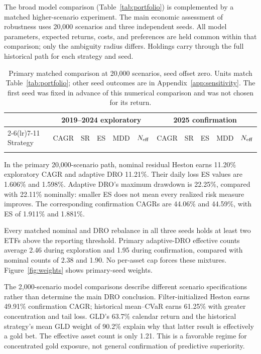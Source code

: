 The broad model comparison (Table~\ref{tab:portfolio}) is complemented by a matched higher-scenario experiment. The main economic assessment of robustness uses 20,000 scenarios and three independent seeds. All model parameters, expected returns, costs, and preferences are held common within that comparison; only the ambiguity radius differs. Holdings carry through the full historical path for each strategy and seed.

\begin{table}[t]
\centering\small\setlength{\tabcolsep}{4pt}
\caption{Primary matched comparison at 20,000 scenarios, seed offset zero. Units match Table~\ref{tab:portfolio}; other seed outcomes are in Appendix~\ref{app:sensitivity}. The first seed was fixed in advance of this numerical comparison and was not chosen for its return.}
\label{tab:paired}
\begin{tabular}{lrrrrrrrrrr}\toprule
&\multicolumn{5}{c}{2019--2024 exploratory}&\multicolumn{5}{c}{2025 confirmation}\\
\cmidrule(lr){2-6}\cmidrule(lr){7-11}
Strategy&CAGR&SR&ES&MDD&$N_{\rm eff}$&CAGR&SR&ES&MDD&$N_{\rm eff}$\\\midrule
\\\bottomrule
\end{tabular}
\end{table}

In the primary 20,000-scenario path, nominal residual Heston earns 11.20\% exploratory CAGR and adaptive DRO 11.21\%. Their daily loss ES values are 1.606\% and 1.598\%. Adaptive DRO's maximum drawdown is 22.25\%, compared with 22.11\% nominally: smaller ES does not mean every realized risk measure improves. The corresponding confirmation CAGRs are 44.06\% and 44.59\%, with ES of 1.911\% and 1.881\%.

Every matched nominal and DRO rebalance in all three seeds holds at least two ETFs above the reporting threshold. Primary adaptive-DRO effective counts average 2.46 during exploration and 1.95 during confirmation, compared with nominal counts of 2.38 and 1.90. No per-asset cap forces these mixtures. Figure~\ref{fig:weights} shows primary-seed weights.

The 2,000-scenario model comparisons describe different scenario specifications rather than determine the main DRO conclusion. Filter-initialized Heston earns 49.91\% confirmation CAGR; historical mean--CVaR earns 61.25\% with greater concentration and tail loss. GLD's 63.7\% calendar return and the historical strategy's mean GLD weight of 90.2\% explain why that latter result is effectively a gold bet. The effective asset count is only 1.21. This is a favorable regime for concentrated gold exposure, not general confirmation of predictive superiority.

